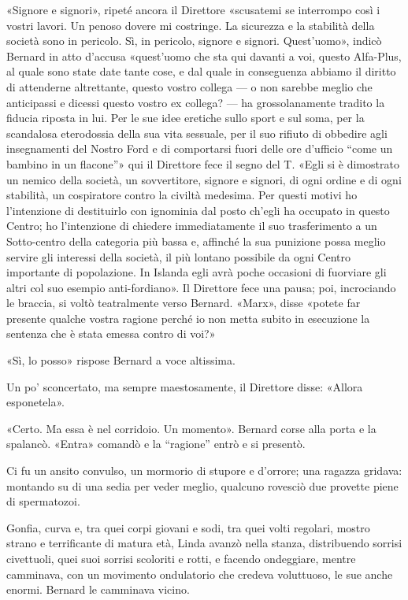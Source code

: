 \documentclass[
a5paper, %
10pt, %
twoside, 
onecolumn, %
openany, %
]{memoir}
\begin{document}
«Signore e signori», ripeté ancora il Direttore «scusatemi se interrompo così i vostri lavori. Un penoso dovere mi costringe. La sicurezza e la stabilità della società sono in pericolo. Sì, in pericolo, signore e signori. Quest’uomo», indicò Bernard in atto d’accusa «quest’uomo che sta qui davanti a voi, questo Alfa-Plus, al quale sono state date tante cose, e dal quale in conseguenza abbiamo il diritto di attenderne altrettante, questo vostro collega — o non sarebbe meglio che anticipassi e dicessi questo vostro ex collega? — ha grossolanamente tradito la fiducia riposta in lui. Per le sue idee eretiche sullo sport e sul soma, per la scandalosa eterodossia della sua vita sessuale, per il suo rifiuto di obbedire agli insegnamenti del Nostro Ford e di comportarsi fuori delle ore d’ufficio “come un bambino in un flacone”» qui il Direttore fece il segno del T. «Egli si è dimostrato un nemico della società, un sovvertitore, signore e signori, di ogni ordine e di ogni stabilità, un cospiratore contro la civiltà medesima. Per questi motivi ho l’intenzione di destituirlo con ignominia dal posto ch’egli ha occupato in questo Centro; ho l’intenzione di chiedere immediatamente il suo trasferimento a un Sotto-centro della categoria più bassa e, affinché la sua punizione possa meglio servire gli interessi della società, il più lontano possibile da ogni Centro importante di popolazione. In Islanda egli avrà poche occasioni di fuorviare gli altri col suo esempio anti-fordiano». Il Direttore fece una pausa; poi, incrociando le braccia, si voltò teatralmente verso Bernard. «Marx», disse «potete far presente qualche vostra ragione perché io non metta subito in esecuzione la sentenza che è stata emessa contro di voi?»

«Sì, lo posso» rispose Bernard a voce altissima.

Un po’ sconcertato, ma sempre maestosamente, il Direttore disse: «Allora esponetela».

«Certo. Ma essa è nel corridoio. Un momento». Bernard corse alla porta e la spalancò. «Entra» comandò e la “ragione” entrò e si presentò.

Ci fu un ansito convulso, un mormorio di stupore e d’orrore; una ragazza gridava: montando su di una sedia per veder meglio, qualcuno rovesciò due provette piene di spermatozoi.

Gonfia, curva e, tra quei corpi giovani e sodi, tra quei volti regolari, mostro strano e terrificante di matura età, Linda avanzò nella stanza, distribuendo sorrisi civettuoli, quei suoi sorrisi scoloriti e rotti, e facendo ondeggiare, mentre camminava, con un movimento ondulatorio che credeva voluttuoso, le sue anche enormi. Bernard le camminava vicino.
\end{document}
